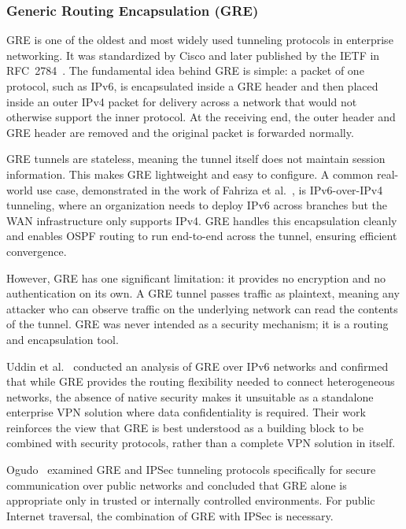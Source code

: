 \documentclass[conference]{IEEEtran}
\begin{document}
\subsubsection{Generic Routing Encapsulation (GRE)}

GRE is one of the oldest and most widely used tunneling protocols
in enterprise networking. It was standardized by Cisco and later
published by the IETF in RFC~2784~\cite{rfc2784}. The fundamental
idea behind GRE is simple: a packet of one protocol, such as IPv6,
is encapsulated inside a GRE header and then placed inside an outer
IPv4 packet for delivery across a network that would not otherwise
support the inner protocol. At the receiving end, the outer header
and GRE header are removed and the original packet is forwarded
normally.

GRE tunnels are stateless, meaning the tunnel itself does not
maintain session information. This makes GRE lightweight and easy
to configure. A common real-world use case, demonstrated in the
work of Fahriza et al.~\cite{fahriza2026}, is IPv6-over-IPv4
tunneling, where an organization needs to deploy IPv6 across
branches but the WAN infrastructure only supports IPv4. GRE handles
this encapsulation cleanly and enables OSPF routing to run
end-to-end across the tunnel, ensuring efficient convergence.

However, GRE has one significant limitation: it provides no
encryption and no authentication on its own. A GRE tunnel passes
traffic as plaintext, meaning any attacker who can observe traffic
on the underlying network can read the contents of the tunnel. GRE
was never intended as a security mechanism; it is a routing and
encapsulation tool.

Uddin et al.~\cite{uddin2021} conducted an analysis of GRE over
IPv6 networks and confirmed that while GRE provides the routing
flexibility needed to connect heterogeneous networks, the absence
of native security makes it unsuitable as a standalone enterprise
VPN solution where data confidentiality is required. Their work
reinforces the view that GRE is best understood as a building block
to be combined with security protocols, rather than a complete VPN
solution in itself.

Ogudo~\cite{ogudo2019} examined GRE and IPSec tunneling protocols
specifically for secure communication over public networks and
concluded that GRE alone is appropriate only in trusted or
internally controlled environments. For public Internet traversal,
the combination of GRE with IPSec is necessary.
\end{document}
